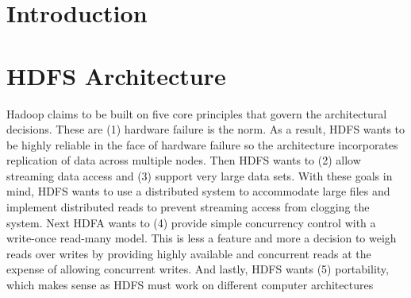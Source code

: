 \documentclass[11pt, a4paper]{article}
\author{\theauthor}
\title{\thetitle}
\date{\duedate}
\begin{document}
\maketitle
\thispagestyle{empty}

\begin{abstract}
\end{abstract}
\begin{multicols*}{2}


\section{Introduction}



\section{HDFS Architecture}



Hadoop claims to be built on five core principles that govern the architectural decisions. These are (1) hardware failure is the norm. As a result, HDFS wants to be highly reliable in the face of hardware failure so the architecture incorporates replication of data across multiple nodes. Then HDFS wants to (2) allow streaming data access and (3) support very large data sets. With these goals in mind, HDFS wants to use a distributed system to accommodate large files and implement distributed reads to prevent streaming access from clogging the system. Next HDFA wants to (4) provide simple concurrency control with a write-once read-many model. This is less a feature and more a decision to weigh reads over writes by providing highly available and concurrent reads at the expense of allowing concurrent writes. And lastly, HDFS wants (5) portability, which makes sense as HDFS must work on different computer architectures 



\end{multicols*}
\end{document}
